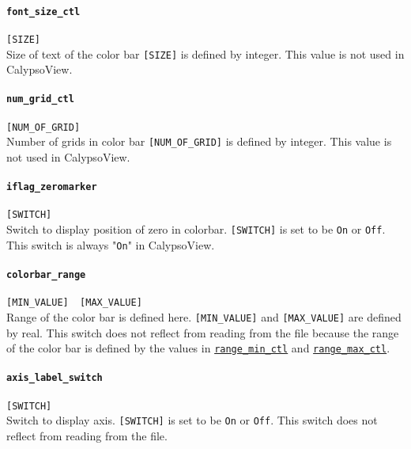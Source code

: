 \paragraph{\tt font\_size\_ctl}
\label{href_t:font_size_ctl}
\verb|[SIZE]| \\
Size of text of the color bar \verb|[SIZE]| is defined by integer. This value is not used in CalypsoView.

\paragraph{\tt num\_grid\_ctl}
\label{href_t:num_grid_ctl}
\verb|[NUM_OF_GRID]| \\
Number of grids in color bar \verb|[NUM_OF_GRID]| is defined by integer. This value is not used in CalypsoView.

\paragraph{\tt iflag\_zeromarker}
\label{href_t:iflag_zeromarker}
\verb|[SWITCH]| \\
Switch to display position of zero in colorbar. \verb|[SWITCH]| is set to be \verb|On| or \verb|Off|. This switch is always "\verb|On|" in CalypsoView.

\paragraph{\tt colorbar\_range}
\label{href_t:colorbar_range}
\verb|[MIN_VALUE]  [MAX_VALUE] | \\
Range of the color bar is defined here. \verb|[MIN_VALUE]| and \verb|[MAX_VALUE]| are defined by real. This switch does not reflect from reading from the file because the range of the color bar is defined by the values in \hyperref[href_t:range_min_ctl]{\tt range\_min\_ctl} and \hyperref[href_t:range_max_ctl]{\tt range\_max\_ctl}.


\paragraph{\tt axis\_label\_switch}
\label{href_t:axis_label_switch}
\verb|[SWITCH]| \\
Switch to display axis. \verb|[SWITCH]| is set to be \verb|On| or \verb|Off|. This switch does not reflect from reading from the file.



